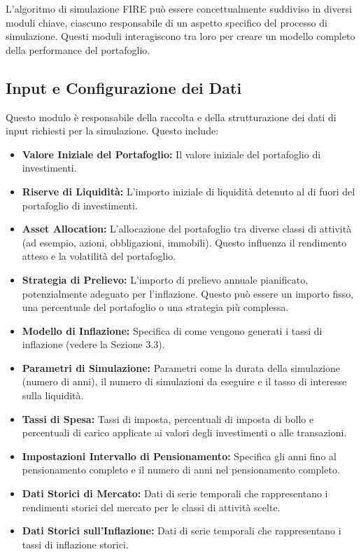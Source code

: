 L'algoritmo di simulazione FIRE può essere concettualmente suddiviso in diversi
moduli chiave, ciascuno responsabile di un aspetto specifico del processo di
simulazione.
Questi moduli interagiscono tra loro per creare un modello completo
della performance del portafoglio.

    \subsection{Input e Configurazione dei
    Dati}\label{subsec:input-e-configurazione-dei-dati}

Questo modulo è responsabile della raccolta e della strutturazione dei dati di
input richiesti per la simulazione.
Questo include:
    \begin{itemize}
        \item \textbf{Valore Iniziale del Portafoglio:} Il valore iniziale del
        portafoglio di investimenti.
        \item \textbf{Riserve di Liquidità:} L'importo iniziale di liquidità
        detenuto al di fuori del portafoglio di investimenti.
        \item \textbf{Asset Allocation:} L'allocazione del portafoglio tra
        diverse classi di attività (ad esempio, azioni, obbligazioni, immobili).
        Questo influenza il rendimento atteso e la volatilità del portafoglio.
        \item \textbf{Strategia di Prelievo:} L'importo di prelievo annuale
        pianificato, potenzialmente adeguato per l'inflazione.
        Questo può essere
        un importo fisso, una percentuale del portafoglio o una strategia più
        complessa.
        \item \textbf{Modello di Inflazione:} Specifica di come vengono generati
        i tassi di inflazione (vedere la Sezione 3.3).
        \item \textbf{Parametri di Simulazione:} Parametri come la durata della
        simulazione (numero di anni), il numero di simulazioni da eseguire e il
        tasso di interesse sulla liquidità.
        \item \textbf{Tassi di Spesa:} Tassi di imposta, percentuali di imposta
        di bollo e percentuali di carico applicate ai valori degli investimenti
        o alle transazioni.
        \item \textbf{Impostazioni Intervallo di Pensionamento:} Specifica gli
        anni fino al pensionamento completo e il numero di anni nel
        pensionamento completo.
        \item \textbf{Dati Storici di Mercato:} Dati di serie temporali che
        rappresentano i rendimenti storici del mercato per le classi di attività
        scelte.
        \item \textbf{Dati Storici sull'Inflazione:} Dati di serie temporali che
        rappresentano i tassi di inflazione storici.
    \end{itemize}

